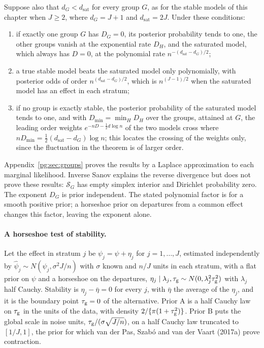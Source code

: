 \begin{corollary}\label{gr:cor:select}
Suppose also that $d_G<d_{\mathrm{sat}}$ for every group $G$, as for the stable models of this chapter when $J\ge2$, where $d_G=J+1$ and $d_{\mathrm{sat}}=2J$. Under these conditions:
\begin{enumerate}
\item[(i)] if exactly one group $G$ has $D_G=0$, its posterior probability tends to one, the other groups vanish at the exponential rate $D_H$, and the saturated model, which always has $D=0$, at the polynomial rate $n^{-(d_{\mathrm{sat}}-d_G)/2}$;
\item[(ii)] a true stable model beats the saturated model only polynomially, with posterior odds of order $n^{(d_{\mathrm{sat}}-d_G)/2}$, which is $n^{(J-1)/2}$ when the saturated model has an effect in each stratum;
\item[(iii)] if no group is exactly stable, the posterior probability of the saturated model tends to one, and with $D_{\min}=\min_HD_H$ over the groups, attained at $G$, the leading order weights $e^{-nD-\frac12d\log n}$ of the two models cross where $nD_{\min}=\tfrac12(d_{\mathrm{sat}}-d_G)\log n$; this locates the crossing of the weights only, since the fluctuation in the theorem is of larger order.
\end{enumerate}
\end{corollary}

Appendix~\ref{pg:sec:groups} proves the results by a Laplace approximation to each marginal likelihood. Inverse Sanov explains the reverse divergence but does not prove these results: $\mathcal S_G$ has empty simplex interior and Dirichlet probability zero. The exponent $D_G$ is prior independent. The stated polynomial factor is for a smooth positive prior; a horseshoe prior on departures from a common effect changes this factor, leaving the exponent alone.

\paragraph{A horseshoe test of stability.} Let the effect in stratum $j$ be $\psi_j=\psi+\eta_j$ for $j=1,\dots,J$, estimated independently by $\hat\psi_j\sim N(\psi_j,\sigma^2J/n)$ with $\sigma$ known and $n/J$ units in each stratum, with a flat prior on $\psi$ and a horseshoe on the departures, $\eta_j\mid\lambda_j,\tau_{\mathrm{g}}\sim N(0,\lambda_j^2\tau_{\mathrm{g}}^2)$ with $\lambda_j$ half Cauchy. Stability is $\eta_j-\bar\eta=0$ for every $j$, with $\bar\eta$ the average of the $\eta_j$, and it is the boundary point $\tau_{\mathrm{g}}=0$ of the alternative. Prior A is a half Cauchy law on $\tau_{\mathrm{g}}$ in the units of the data, with density $2/\{\pi(1+\tau_{\mathrm{g}}^2)\}$. Prior B puts the global scale in noise units, $\tau_{\mathrm{g}}/(\sigma\sqrt{J/n})$, on a half Cauchy law truncated to $[1/J,1]$, the prior for which van der Pas, Szab\'o and van der Vaart (2017a) prove contraction.

